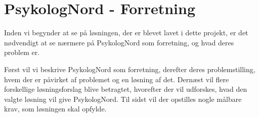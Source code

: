 \section{PsykologNord - Forretning}

Inden vi begynder at se på løsningen, der er blevet lavet i dette projekt, er det nødvendigt at se nærmere på PsykologNord som forretning, og hvad deres problem er.

Først vil vi beskrive PsykologNord som forretning, derefter deres problemstilling, hvem der er påvirket af problemet og en løsning af det.
Dernæst vil flere forskellige løsningsforslag blive betragtet, hvorefter der vil udforskes, hvad den valgte løsning vil give PsykologNord.
Til sidst vil der opstilles nogle målbare krav, som løsningen skal opfylde.









